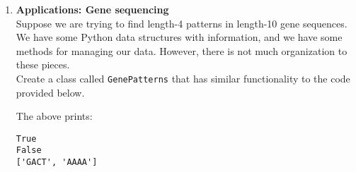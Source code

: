 \documentclass{article}
\newcounter{points}
\newcommand\printpoints{Total number of points: \thepoints}
\begin{document}
\begin{enumerate}
\newpage
\item \textbf{Applications: Gene sequencing} \\
Suppose we are trying to find length-4 patterns in length-10 gene sequences.  We have some Python data structures with information, and we have some methods for managing our data.  However, there is not much organization to these pieces. \\

Create a class called \texttt{GenePatterns} that has similar functionality to the code provided below. \\



\newpage


The above prints:
\begin{verbatim}
True
False
['GACT', 'AAAA']
\end{verbatim}



\end{enumerate}
\end{document}
